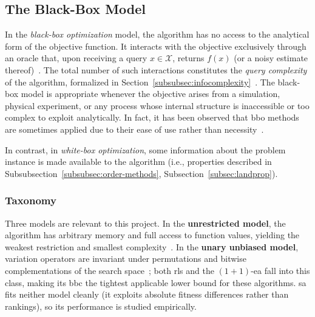 \subsection{The Black-Box Model}

In the \textit{black-box optimization} model, the algorithm has no access to the
analytical form of the objective function. It interacts with the
objective exclusively
through an oracle that, upon receiving a query $x \in \mathcal{X}$,
returns $f(x)$ (or
  a noisy estimate
thereof)~\cite{droste2006blackbox,doerr2020theory,lengler2019drift}.
The total number of such
interactions constitutes the
\textit{query complexity} of the algorithm, formalized in
Section~\ref{subsubsec:infocomplexity}~\cite{nocedal2006numerical,
droste2006blackbox}.
The black-box model is appropriate whenever the objective arises from
a simulation,
physical experiment, or any process whose internal structure is
inaccessible or too
complex to exploit analytically. In fact, it has been observed that
\acrshort{bbo} methods are sometimes applied due to their ease of use
rather than necessity~\cite{bajaj2021black}.

In contrast, in \textit{white-box optimization}, some information about
the problem instance is made available to
the algorithm (i.e., properties described in
Subsubsection~\ref{subsubsec:order-methods}, Subsection~\ref{subsec:landprop}).

\subsubsection{Taxonomy}

Three models are relevant to this project. In the
\textbf{unrestricted model}, the algorithm has arbitrary memory and
full access to function values, yielding the weakest restriction and
smallest complexity~\cite{droste2006blackbox}. In the \textbf{unary
unbiased model}, variation operators are invariant under permutations
and bitwise complementations of the search
space~\cite{lehre2010black}; both \acrshort{rls} and the
$(1+1)$-\acrshort{ea} fall into this class, making its \acrshort{bbc}
the tightest applicable lower bound for these algorithms.
\acrshort{sa} fits neither model cleanly (it exploits absolute fitness
differences rather than rankings), so its performance is studied empirically.

